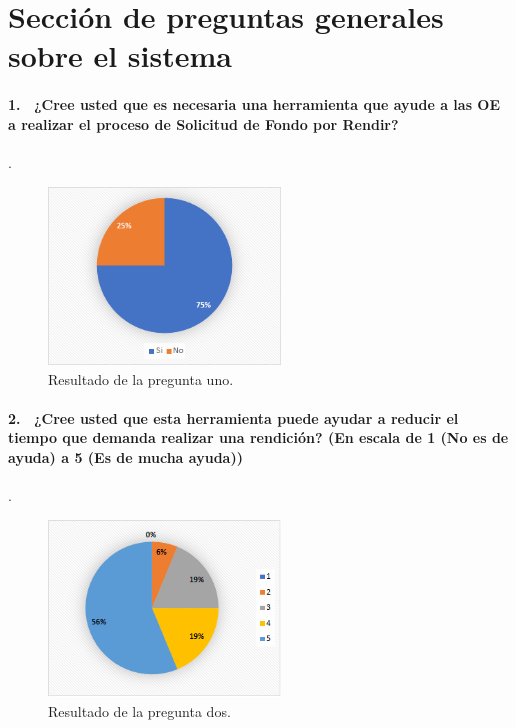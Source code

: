 \section{Sección de preguntas generales sobre el sistema}

\paragraph{1.  ¿Cree usted que es necesaria una herramienta que ayude a las OE a realizar el proceso de Solicitud de Fondo por Rendir?}.

    \begin{figure}[h!]
        \centering
        \includegraphics[width=0.55\textwidth]{Imagenes/Pregunta1.png}
        \caption{\label{fig: Pregunta1}Resultado de la pregunta uno.}
    \end{figure}

\paragraph{2.  ¿Cree usted que esta herramienta puede ayudar a reducir el tiempo que demanda realizar una rendición? (En escala de 1 (No es de ayuda) a 5 (Es de mucha ayuda))}.

\begin{figure}[h!]
    \centering
    \includegraphics[width=0.55\textwidth]{Imagenes/Pregunta2.png}
    \caption{\label{fig: Pregunta2}Resultado de la pregunta dos.}
\end{figure}

